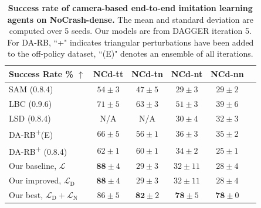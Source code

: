 \begin{table}
	\caption{\textbf{Success rate of camera-based end-to-end imitation learning agents on NoCrash-dense.}
		The mean and standard deviation are computed over 5 seeds. 
		Our models are from DAGGER iteration 5. 
		For DA-RB, ``+" indicates triangular perturbations have been added to the off-policy dataset, ``(E)" denotes an ensemble of all iterations.}
	\setlength{\tabcolsep}{6.67pt}
	\centering
	\begin{tabular}{lccccc}
		\hline
		Success Rate \% $\uparrow$
		&  NCd-tt & NCd-tn  & NCd-nt & NCd-nn  \\ 
		\hline
		SAM \cite{zhao2021sam} (0.8.4) & 
		$54 \pm 3$ & $47 \pm 5$ & $29 \pm 3$ & $29 \pm 2$ \\
		LBC \cite{chen2020learning} (0.9.6) & 
		$71 \pm 5$ & $63 \pm 3$ & $51 \pm 3$ & $39 \pm 6$ \\
		LSD \cite{ohn2020learning} (0.8.4) & 
		N/A & N/A & $30 \pm 4$ & $32 \pm 3$ \\
		DA-RB\textsuperscript{+}(E) \cite{prakash2020exploring} & 
		$66 \pm 5$ & $56 \pm 1$ & $36 \pm 3$ & $35 \pm 2$ \\
		DA-RB\textsuperscript{+} \cite{prakash2020exploring} (0.8.4)  & 
		$62 \pm 1$ & $60 \pm 1$ & $34 \pm 2$ & $25 \pm 1$ \\
		Our baseline, $\mathcal{L}$ & 
		$\mathbf{88} \pm 4$ & $29 \pm 3$ & $32 \pm 11$ & $28 \pm 4$ \\
		Our improved, $\mathcal{L}_\text{D} $ & 
		$\mathbf{88} \pm 4$ & $29 \pm 3$ & $32 \pm 11$ & $28 \pm 4$ \\
		Our best, $\mathcal{L}_\text{D}+\mathcal{L}_\text{N}$ & 
		$86 \pm 5$ & $\mathbf{82} \pm 2$ & $\mathbf{78} \pm 5$ & $\mathbf{78} \pm 0$ \\
		\hline
	\end{tabular}
	\vspace{-1ex}
	\label{table:sucess_rate_nc_dense}
	\vspace{-2ex}
\end{table}

